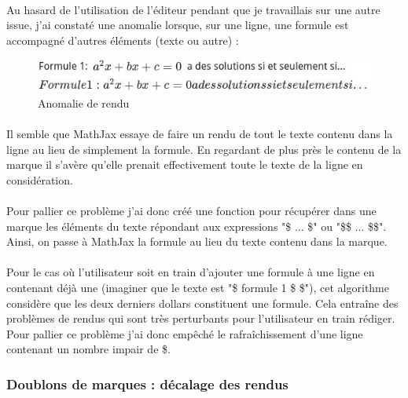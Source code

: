 \documentclass[12pt]{article}
\begin{document}
\paragraph{}
Au hasard de l'utilisation de l'éditeur pendant que je travaillais sur une autre issue, j'ai constaté une anomalie lorsque, sur une ligne, une formule est accompagné d'autres éléments (texte ou autre) :

\begin{figure}[H]
    \centering
    \includegraphics[scale=0.9]{gallery/whole_line.jpg}
    \caption[nom dans le sommaire]{Anomalie de rendu}
    \label{fig:gallery6}
\end{figure}

\paragraph{}
Il semble que MathJax essaye de faire un rendu de tout le texte contenu dans la ligne au lieu de simplement la formule. En regardant de plus près le contenu de la marque il s'avère qu'elle prenait effectivement toute le texte de la ligne en considération.
\paragraph{}
Pour pallier ce problème j'ai donc créé une fonction pour récupérer dans une marque les éléments du texte répondant aux expressions "\$ ... \$" ou "\$\$ ... \$\$". Ainsi, on passe à MathJax la formule au lieu du texte contenu dans la marque.
\paragraph{}
Pour le cas où l'utilisateur soit en train d'ajouter une formule à une ligne en contenant déjà une (imaginer que le texte est "\$ formule 1 \$ \$"), cet algorithme considère que les deux derniers dollars constituent une formule. Cela entraîne des problèmes de rendus qui sont très perturbants pour l'utilisateur en train rédiger. Pour pallier ce problème j'ai donc empêché le rafraîchissement d'une ligne contenant un nombre impair de \$.\\

\subsubsection{Doublons de marques : décalage des rendus}
\end{document}
